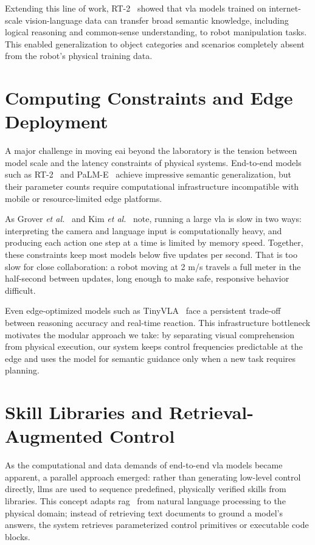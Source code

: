 \documentclass[
     12pt,
     a4paper,
     BCOR=10mm,
     DIV=14,
     listof=totoc,
     bibliography=totoc,
     parskip,
     twoside,
     headsepline
     ]{scrreprt}
\begin{document}
Extending this line of work, RT-2~\cite{brohan2023rt2visionlanguageactionmodelstransfer} showed that \gls{vla} models trained on internet-scale vision-language data can transfer broad semantic knowledge, including logical reasoning and common-sense understanding, to robot manipulation tasks. This enabled generalization to object categories and scenarios completely absent from the robot's physical training data.

\section{Computing Constraints and Edge Deployment}
A major challenge in moving \gls{eai} beyond the laboratory is the tension between model scale and the latency constraints of physical systems. End-to-end models such as RT-2~\cite{brohan2023rt2visionlanguageactionmodelstransfer} and PaLM-E~\cite{driess2023palmeembodiedmultimodallanguage} achieve impressive semantic generalization, but their parameter counts require computational infrastructure incompatible with mobile or resource-limited edge platforms.

As Grover \emph{et al.}~\cite{grover2026embodiedfoundationmodelsedge} and Kim \emph{et al.}~\cite{kim2024openvlaopensourcevisionlanguageactionmodel} note, running a large \gls{vla} is slow in two ways: interpreting the camera and language input is computationally heavy, and producing each action one step at a time is limited by memory speed. Together, these constraints keep most models below five updates per second. That is too slow for close collaboration: a robot moving at 2 m/s travels a full meter in the half-second between updates, long enough to make safe, responsive behavior difficult.

Even edge-optimized models such as TinyVLA~\cite{wen2025tinyvlafastdataefficientvisionlanguageaction} face a persistent trade-off between reasoning accuracy and real-time reaction. This infrastructure bottleneck motivates the modular approach we take: by separating visual comprehension from physical execution, our system keeps control frequencies predictable at the edge and uses the model for semantic guidance only when a new task requires planning.

\section{Skill Libraries and Retrieval-Augmented Control}
As the computational and data demands of end-to-end \gls{vla} models became apparent, a parallel approach emerged: rather than generating low-level control directly, \gls{llm}s are used to sequence predefined, physically verified skills from libraries. This concept adapts \gls{rag}~\cite{lewis2021retrievalaugmentedgenerationknowledgeintensivenlp} from natural language processing to the physical domain; instead of retrieving text documents to ground a model's answers, the system retrieves parameterized control primitives or executable code blocks.
\end{document}
